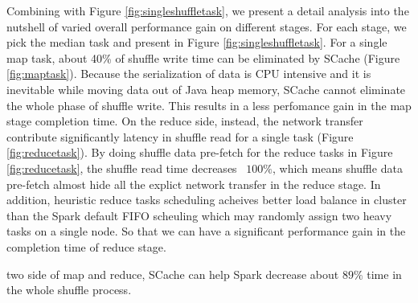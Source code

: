 Combining with Figure \ref{fig:singleshuffletask}, we present a detail analysis into the nutshell of varied overall performance gain on different stages. For each stage, we pick the median task and present in Figure \ref{fig:singleshuffletask}. For a single map task, about 40\% of shuffle write time can be eliminated by SCache (Figure \ref{fig:maptask}). Because the serialization of data is CPU intensive\cite{makingsense} and it is inevitable while moving data out of Java heap memory, SCache cannot eliminate the whole phase of shuffle write. This results in a less perfomance gain in the map stage completion time.
On the reduce side, instead, the network transfer contribute significantly latency in shuffle read for a single task (Figure \ref{fig:reducetask}). By doing shuffle data pre-fetch for the reduce tasks in Figure \ref{fig:reducetask}, the shuffle read time decreases ~$100\%$, which means shuffle data pre-fetch almost hide all the explict network transfer in the reduce stage. In addition, heuristic reduce tasks scheduling acheives better load balance in cluster than the Spark default FIFO scheuling which may randomly assign two heavy tasks on a single node. So that we can have a significant performance gain in the completion time of reduce stage. 

 two side of map and reduce, SCache can help Spark decrease about $89\%$ time in the whole shuffle process.

